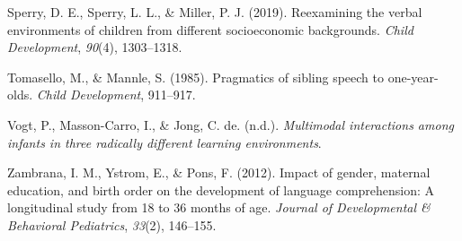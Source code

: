 \documentclass[
  man,floatsintext]{apa6}
\newlength{\cslhangindent}
\newlength{\cslentryspacingunit} %
\newenvironment{CSLReferences}[2] %
 {%
  \setlength{\parindent}{0pt}
  \ifodd #1
  \let\oldpar\par
  \def\par{\hangindent=\cslhangindent\oldpar}
  \fi
  \setlength{\parskip}{#2\cslentryspacingunit}
 }%
 {}
\begin{document}
\begin{CSLReferences}{1}{0}
\leavevmode{}%
Sperry, D. E., Sperry, L. L., \& Miller, P. J. (2019). Reexamining the verbal environments of children from different socioeconomic backgrounds. \emph{Child Development}, \emph{90}(4), 1303--1318.

\leavevmode{}%
Tomasello, M., \& Mannle, S. (1985). Pragmatics of sibling speech to one-year-olds. \emph{Child Development}, 911--917.

\leavevmode{}%
Vogt, P., Masson-Carro, I., \& Jong, C. de. (n.d.). \emph{Multimodal interactions among infants in three radically different learning environments}.

\leavevmode{}%
Zambrana, I. M., Ystrom, E., \& Pons, F. (2012). Impact of gender, maternal education, and birth order on the development of language comprehension: A longitudinal study from 18 to 36 months of age. \emph{Journal of Developmental \& Behavioral Pediatrics}, \emph{33}(2), 146--155.

\end{CSLReferences}
\end{document}
